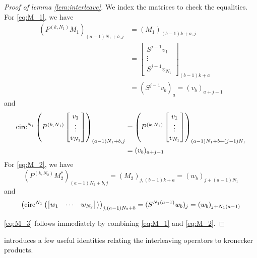 \begin{proof}[Proof of lemma \ref{lem:interleave}]
  We index the matrices to check the equalities.  For \eqref{eq:M_1}, we have \begin{align*}
    (P^{(k, N_1)} M_1)_{(a-1)N_1 + b, j} &= (M_1)_{(b - 1) k + a, j} \\ &= \begin{bmatrix} S^{j - 1}v_1 \\ \vdots \\ S^{j - 1} v_{N_1} \end{bmatrix}_{(b - 1)k + a} \\ &= (S^{j - 1}v_b)_a = (v_b)_{a + j - 1}
  \end{align*}
  and
  \begin{align*}
    \circop^{N_1}\left(P^{(k, N_1)} \begin{bmatrix} v_1 \\ \vdots \\ v_{N_1} \end{bmatrix}\right)_{(a-1)N_1 + b, j} &= \left(P^{(k, N_1)} \begin{bmatrix} v_1 \\ \vdots \\ v_{N_1} \end{bmatrix}\right)_{(a - 1)N_1 + b + (j-1)N_1} \\
    &= %
    (v_b)_{a + j - 1}
  \end{align*}
  For \eqref{eq:M_2}, we have
 \[(P^{(k, N_2)} M_2^*)_{(a - 1)N_2 + b, j} = (M_2)_{j, (b - 1) k + a} = (w_b)_{j + (a - 1)N_1}\]
  and
  \[\left(\operatorname{circ}^{N_1}\left(\begin{bmatrix} w_1 & \cdots & w_{N_2} \end{bmatrix}\right)\right)_{j, (a - 1)N_2 + b} = (S^{N_1(a - 1)} w_b)_j = (w_b)_{j + N_1(a - 1)}\]

  \eqref{eq:M_3} follows immediately by combining \eqref{eq:M_1} and \eqref{eq:M_2}.
\end{proof}

 introduces a few useful identities relating the interleaving operators to kronecker products.

